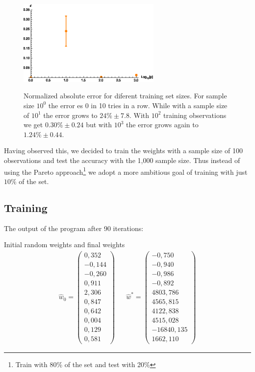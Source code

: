 \documentclass[a4paper,10pt,twocolumn]{article}
\begin{document}
\begin{figure}[!ht]
\begin{center} \label{batch}
\includegraphics[width=7cm]{eps.eps}
\caption{Normalized absolute error for diferent training set sizes. For sample size $10^0$ the error es 0 in 10 tries in a row. While with a sample size of $10^1$ the error grows to $24\%\pm 7.8$. With $10^2$ training observations we get $0.30\%\pm 0.24$ but with $10^3$ the error grows again to $1.24\%\pm 0.44$.  }
\end{center}
\end{figure}

Having observed this, we decided to train the weights with a sample size of 100 observations and test the accuracy with the 1,000 sample size. Thus instead of using the Pareto approach\footnote{Train with 80\% of the set and test with 20\%} we adopt a more ambitious goal of training with just $10\%$ of the set.

\subsection{Training}
The output of the program after 90 iterations:

Initial random weights and final weights
\begin{equation}
\begin{aligned}
\hat{w}_0= \left(
\begin{array}{r}
0,352\\
-0,144\\
-0,260\\
0,911\\
2,306\\
0,847\\
0,642\\
0,004\\
0,129\\
0,581
\end{array}
\right)
&&\hat{w}^*= \left(
\begin{array}{r}
-0,750\\
-0,940\\
-0,986\\
-0,892\\
4803,786\\
4565,815\\
4122,838\\
4515,028\\
-16840,135\\
1662,110
\end{array}
\right)
\end{aligned}
\end{equation}
\end{document}
